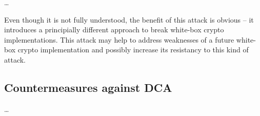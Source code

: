 \ldots

Even though it is not fully understood, the benefit of this attack is obvious -- it introduces a principially different approach to break white-box crypto implementations. This attack may help to address weaknesses of a future white-box crypto implementation and possibly increase its resistancy to this kind of attack.

\subsection{Countermeasures against DCA}

\ldots


